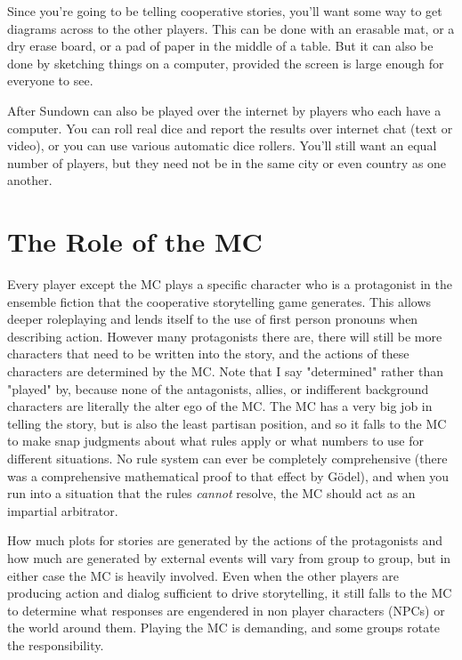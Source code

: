 Since you're going to be telling cooperative stories, you'll want some way to get diagrams across to the other players. This can be done with an erasable mat, or a dry erase board, or a pad of paper in the middle of a table. But it can also be done by sketching things on a computer, provided the screen is large enough for everyone to see.

After Sundown can also be played over the internet by players who each have a computer. You can roll real dice and report the results over internet chat (text or video), or you can use various automatic dice rollers. You'll still want an equal number of players, but they need not be in the same city or even country as one another.

\section{The Role of the MC}

Every player except the MC plays a specific character who is a protagonist in the ensemble fiction that the cooperative storytelling game generates. This allows deeper roleplaying and lends itself to the use of first person pronouns when describing action. However many protagonists there are, there will still be more characters that need to be written into the story, and the actions of these characters are determined by the MC. Note that I say "determined" rather than "played" by, because none of the antagonists, allies, or indifferent background characters are literally the alter ego of the MC. The MC has a very big job in telling the story, but is also the least partisan position, and so it falls to the MC to make snap judgments about what rules apply or what numbers to use for different situations. No rule system can ever be completely comprehensive (there was a comprehensive mathematical proof to that effect by G\"{o}del), and when you run into a situation that the rules \textit{cannot} resolve, the MC should act as an impartial arbitrator.

How much plots for stories are generated by the actions of the protagonists and how much are generated by external events will vary from group to group, but in either case the MC is heavily involved. Even when the other players are producing action and dialog sufficient to drive storytelling, it still falls to the MC to determine what responses are engendered in non player characters (NPCs) or the world around them. Playing the MC is demanding, and some groups rotate the responsibility.
